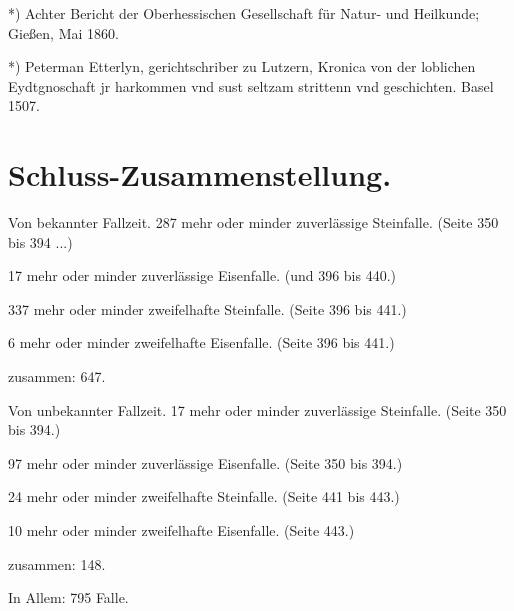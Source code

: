\documentclass[a4paper, 11pt, oneside, polutonikogreek, german]{article}
\begin{document}
*) Achter Bericht der Oberhessischen Gesellschaft für Natur- und Heilkunde; Gießen, Mai 1860.

*) Peterman Etterlyn, gerichtschriber zu Lutzern, Kronica von der loblichen Eydtgnoschaft jr harkommen vnd sust seltzam strittenn vnd geschichten. Basel 1507.
\clearpage
\section{Schluss-Zusammenstellung.}
Von bekannter Fallzeit.
287 mehr oder minder zuverlässige Steinfalle. (Seite 350 bis 394 ...)

17 mehr oder minder zuverlässige Eisenfalle. (und 396 bis 440.)

337 mehr oder minder zweifelhafte Steinfalle. (Seite 396 bis 441.)

6 mehr oder minder zweifelhafte Eisenfalle. (Seite 396 bis 441.)

zusammen: 647.

Von unbekannter Fallzeit.
17 mehr oder minder zuverlässige Steinfalle. (Seite 350 bis 394.)

97 mehr oder minder zuverlässige Eisenfalle. (Seite 350 bis 394.)

24 mehr oder minder zweifelhafte Steinfalle. (Seite 441 bis 443.)

10 mehr oder minder zweifelhafte Eisenfalle. (Seite 443.)

zusammen: 148.

In Allem: 795 Falle.
\end{document}
